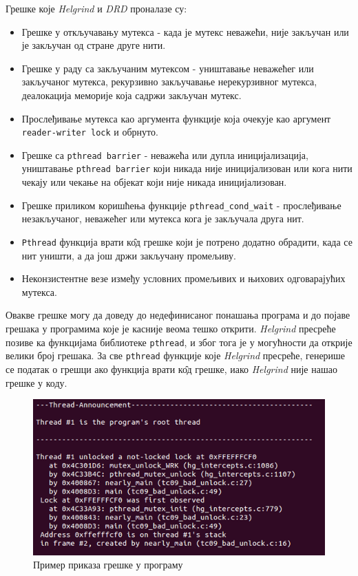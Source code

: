 \documentclass[12pt,oneside]{memoir}
\begin{document}
Грешке које \textit{Helgrind} и \textit{DRD} проналазе су:
\begin{itemize}
	\item Грешке у откључавању мутекса - када је мутекс неважећи, није закључан или је закључан од стране друге нити.
	\item Грешке у раду са закључаним мутексом - уништавање неважећег или закључаног мутекса, рекурзивно закључавање нерекурзивног мутекса, деалокација меморије која садржи закључан мутекс.
	\item Прослеђивање мутекса као аргумента функције која очекује као аргумент  \texttt{reader-writer lock} и обрнуто.
	\item Грешке са \texttt{pthread barrier} - неважећа или дупла иницијализација,  уништавање \texttt{pthread barrier} који никада није иницијализован или кога нити чекају или чекање на објекат који није никада иницијализован.
	\item Грешке приликом коришћења функције \texttt{pthread\_cond\_wait} - прослеђивање незакључаног, неважећег или мутекса кога је закључала друга нит.
	\item \texttt{Pthread} функција врати к\^{о}д грешке који је потрено додатно обрадити, када се нит уништи, а да још држи закључану промељиву.
	\item Неконзистентне везе између условних промељивих и њихових одговарајућих мутекса. 
\end{itemize}

\indent Овакве грешке могу да доведу до недефинисаног понашања програма и до појаве грешака у програмима које је касније веома тешко открити. \textit{Helgrind} пресреће позиве ка функцијама библиотеке \texttt{pthread}, и због тога је у могућности да открије велики број грешака. За све \texttt{pthread} функције које \textit{Helgrind} пресреће, генерише се податак о грешци ако функција врати к\^{о}д грешке, иако \textit{Helgrind} није нашао грешке у коду.

\begin{figure}[h!]
\begin{center}
\includegraphics[scale=0.75]{slika13.png}
\end{center}
\caption{Пример приказа грешке у програму}
\label{fig:interfejs}
\end{figure}
\end{document}
